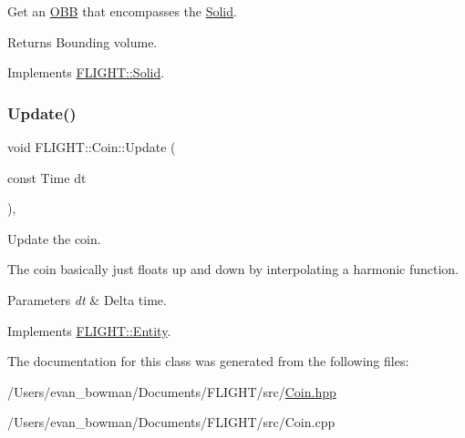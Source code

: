 Get an \hyperlink{class_f_l_i_g_h_t_1_1_o_b_b}{O\+BB} that encompasses the \hyperlink{class_f_l_i_g_h_t_1_1_solid}{Solid}. 

\begin{DoxyReturn}{Returns}
Bounding volume. 
\end{DoxyReturn}


Implements \hyperlink{class_f_l_i_g_h_t_1_1_solid_a8234bad63b8aff2f613407d80eee4bef}{F\+L\+I\+G\+H\+T\+::\+Solid}.

\mbox{\label{class_f_l_i_g_h_t_1_1_coin_a22a213738cf0e29a32b094cb7695e7c0}} 
\subsubsection{\texorpdfstring{Update()}{Update()}}
{\footnotesize\ttfamily void F\+L\+I\+G\+H\+T\+::\+Coin\+::\+Update (\begin{DoxyParamCaption}\item[{const Time}]{dt }\end{DoxyParamCaption})\hspace{0.3cm}{\ttfamily [override]}, {\ttfamily [virtual]}}



Update the coin. 

The coin basically just floats up and down by interpolating a harmonic function. 
\begin{DoxyParams}{Parameters}
{\em dt} & Delta time. \\
\hline
\end{DoxyParams}


Implements \hyperlink{class_f_l_i_g_h_t_1_1_entity_afb03ab9c3239e0651101cc3103c7c503}{F\+L\+I\+G\+H\+T\+::\+Entity}.



The documentation for this class was generated from the following files\+:\begin{DoxyCompactItemize}
\item 
/\+Users/evan\+\_\+bowman/\+Documents/\+F\+L\+I\+G\+H\+T/src/\hyperlink{_coin_8hpp}{Coin.\+hpp}\item 
/\+Users/evan\+\_\+bowman/\+Documents/\+F\+L\+I\+G\+H\+T/src/Coin.\+cpp\end{DoxyCompactItemize}
